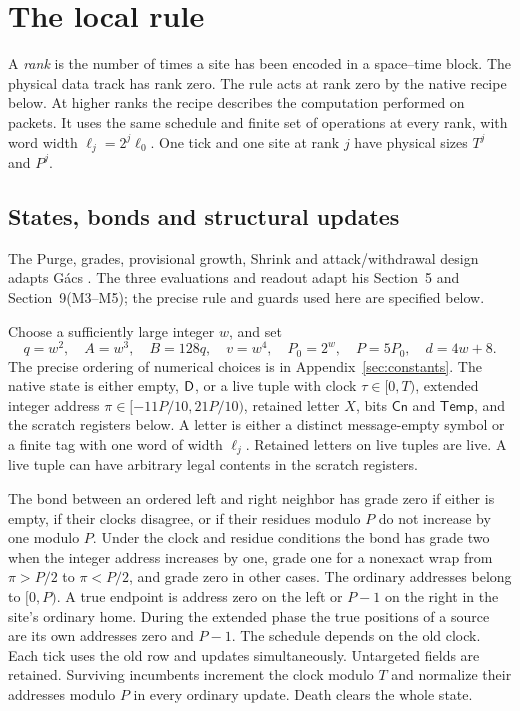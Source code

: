 \section{The local rule}\label{sec:construction}

A \emph{rank} is the number of times a site has been encoded in a space--time block. The physical data track has rank zero. The rule acts at rank zero by the native recipe below. At higher ranks the recipe describes the computation performed on packets. It uses the same schedule and finite set of operations at every rank, with word width \(\ell_j=2^j\ell_0\). One tick and one site at rank \(j\) have physical sizes \(T^j\) and \(P^j\).

\subsection{States, bonds and structural updates}\label{sec:native}
The Purge, grades, provisional growth, Shrink and attack/withdrawal design adapts G\'acs \cite[Section~7(1--5), Section~9(M1--M12)]{gacs86}. The three evaluations and readout adapt his Section~5 and Section~9(M3--M5); the precise rule and guards used here are specified below.

Choose a sufficiently large integer \(w\), and set
\[
q=w^2,\quad A=w^3,\quad B=128q,\quad v=w^4,\quad
P_0=2^w,\quad P=5P_0,\quad d=4w+8 .
\]
The precise ordering of numerical choices is in Appendix~\ref{sec:constants}. The native state is either empty, \(\mathsf D\), or a live tuple with clock \(\tau\in[0,T)\), extended integer address \(\pi\in[-11P/10,21P/10)\), retained letter \(X\), bits \(\mathsf{Cn}\) and \(\mathsf{Temp}\), and the scratch registers below. A letter is either a distinct message-empty symbol or a finite tag with one word of width \(\ell_j\). Retained letters on live tuples are live. A live tuple can have arbitrary legal contents in the scratch registers.

The bond between an ordered left and right neighbor has grade zero if either is empty, if their clocks disagree, or if their residues modulo \(P\) do not increase by one modulo \(P\). Under the clock and residue conditions the bond has grade two when the integer address increases by one, grade one for a nonexact wrap from \(\pi>P/2\) to \(\pi<P/2\), and grade zero in other cases. The ordinary addresses belong to \([0,P)\). A true endpoint is address zero on the left or \(P-1\) on the right in the site's ordinary home. During the extended phase the true positions of a source are its own addresses zero and \(P-1\). The schedule depends on the old clock. Each tick uses the old row and updates simultaneously. Untargeted fields are retained. Surviving incumbents increment the clock modulo \(T\) and normalize their addresses modulo \(P\) in every ordinary update. Death clears the whole state.


